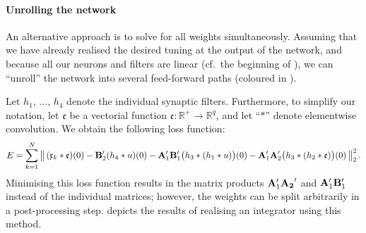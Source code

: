\paragraph{Unrolling the network}
An alternative approach is to solve for all weights simultaneously.
Assuming that we have already realised the desired tuning at the output of the network, and because all our neurons and filters are linear (cf.~the beginning of ), we can \enquote{unroll} the network into several feed-forward paths (coloured in ).

Let $h_1$, $\ldots$, $h_4$ denote the individual synaptic filters.
Furthermore, to simplify our notation, let $\mathfrak{e}$ be a vectorial function $\mathfrak{e} : \mathbb{R}^+ \longrightarrow \mathbb{R}^q$, and let \enquote{$\ast$} denote elementwise convolution.
We obtain the following loss function:
{%
\newcommand{\pathOne}[1]{#1}%
\newcommand{\pathTwo}[1]{#1}%
\newcommand{\pathThree}[1]{#1}%
\begin{align}
	E = \sum_{k = 1}^N \, \bigl\| \, (\mathfrak{x}_k \ast \mathfrak{e})(0)
		- \pathOne{\mat{B}_2' (h_4 \ast u)(0)}
		- \pathTwo{\mat{A}_1' \mat{B}_1' \bigl(h_3 \ast (h_1 \ast u)\bigr)(0)}
		- \pathThree{\mat{A}_1' \mat{A}_2' \bigl(h_3 \ast (h_2 \ast \mathfrak{e})\bigr)(0)}
	\, \bigr\|_2^2 \,.
\end{align}}%
Minimising this loss function results in the matrix products $\mathbf{A}_1' \mathbf{A_2}'$ and $\mathbf{A}_1' \mathbf{B}_1'$ instead of the individual matrices; however, the weights can be split arbitrarily in a post-processing step.
 depicts the results of realising an integrator using this method.
